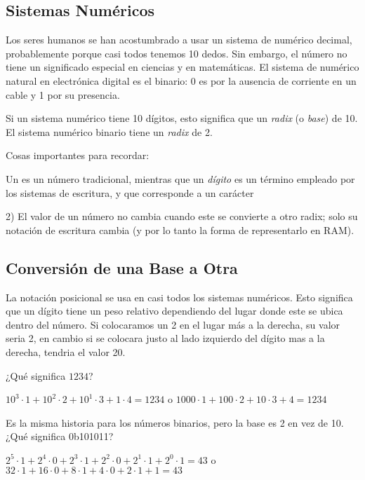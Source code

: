 \subsection{Sistemas Numéricos}

Los seres humanos se han acostumbrado a usar un sistema de numérico decimal, probablemente porque casi todos tenemos 10 dedos.
Sin embargo, el número  no tiene un significado especial en ciencias y en matemáticas.
El sistema de numérico natural en electrónica digital es el binario: 0 es por la ausencia de corriente en un cable y 1 por su presencia.

Si un sistema numérico tiene 10 dígitos, esto significa que un \emph{radix} (o \emph{base}) de 10.
El sistema numérico binario tiene un \emph{radix} de 2.

Cosas importantes para recordar:

Un  es un número tradicional, mientras que un \emph{dígito} es un término empleado por los sistemas de escritura, y que corresponde a un carácter

2) El valor de un número no cambia cuando este se convierte a otro radix; solo su notación de escritura cambia (y por lo tanto la forma de representarlo en \ac {RAM}).

\subsection{Conversión de una Base a Otra}

La notación posicional se usa en casi todos los sistemas numéricos. Esto significa que un dígito tiene un peso relativo dependiendo del lugar donde este se ubica dentro del número.
Si colocaramos un 2 en el lugar más a la derecha, su valor seria 2, en cambio si se colocara justo al lado izquierdo del dígito mas a la derecha, tendria el valor 20.

¿Qué significa $1234$?

$10^3 \cdot 1 + 10^2 \cdot 2 + 10^1 \cdot 3 + 1 \cdot 4 = 1234$ o
$1000 \cdot 1 + 100 \cdot 2 + 10 \cdot 3 + 4 = 1234$

Es la misma historia para los números binarios, pero la base es 2 en vez de 10.
¿Qué significa 0b101011?

$2^5 \cdot 1 + 2^4 \cdot 0 + 2^3 \cdot 1 + 2^2 \cdot 0 + 2^1 \cdot 1 + 2^0 \cdot 1 = 43$ o
$32 \cdot 1 + 16 \cdot 0 + 8 \cdot 1 + 4 \cdot 0 + 2 \cdot 1 + 1 = 43$

